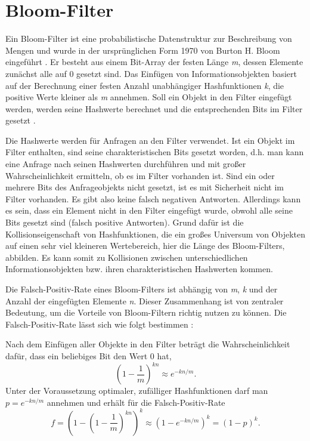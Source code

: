 \section{Bloom-Filter}\label{sec:bloom}
Ein Bloom-Filter ist eine probabilistische Datenstruktur zur Beschreibung von Mengen und wurde in der ursprünglichen Form 1970 von Burton H. Bloom eingeführt \cite{Bloom1970}. Er besteht aus einem Bit-Array der festen Länge \textit{m}, dessen Elemente zunächst alle auf 0 gesetzt sind. Das Einfügen von Informationsobjekten basiert auf der Berechnung einer festen Anzahl unabhängiger Hashfunktionen \textit{k}, die positive Werte kleiner als \textit{m} annehmen. Soll ein Objekt in den Filter eingefügt werden, werden seine Hashwerte berechnet und die entsprechenden Bits im Filter gesetzt \cite{Broder2004}. 

Die Hashwerte werden für Anfragen an den Filter verwendet. Ist ein Objekt im Filter enthalten, sind seine charakteristischen Bits gesetzt worden, d.h. man kann eine Anfrage nach seinen Hashwerten durchführen und mit großer Wahrscheinlichkeit ermitteln, ob es im Filter vorhanden ist. Sind ein oder mehrere Bits des Anfrageobjekts nicht gesetzt, ist es mit Sicherheit nicht im Filter vorhanden. Es gibt also keine falsch negativen Antworten. Allerdings kann es sein, dass ein Element nicht in den Filter eingefügt wurde, obwohl alle seine Bits gesetzt sind (falsch positive Antworten). Grund dafür ist die Kollisionseigenschaft von Hashfunktionen, die ein großes Universum von Objekten auf einen sehr viel kleineren Wertebereich, hier die Länge des Bloom-Filters, abbilden. Es kann somit zu Kollisionen zwischen unterschiedlichen Informationsobjekten bzw. ihren charakteristischen Hashwerten kommen. 

Die Falsch-Positiv-Rate eines Bloom-Filters ist abhängig von \textit{m}, \textit{k} und der Anzahl der eingefügten Elemente \textit{n}. Dieser Zusammenhang ist von zentraler Bedeutung, um die Vorteile von Bloom-Filtern richtig nutzen zu können. Die Falsch-Positiv-Rate lässt sich wie folgt bestimmen \cite{Broder2004}: 

Nach dem Einfügen aller Objekte in den Filter beträgt die Wahrscheinlichkeit dafür, dass ein beliebiges Bit den Wert 0 hat, 
\[\left(1 - \frac{1}{m}\right)^{kn}\approx e^{-kn/m}.\]
Unter der Voraussetzung optimaler, zufälliger Hashfunktionen darf man $p = e^{-kn/m}$ annehmen und erhält für die Falsch-Positiv-Rate
\[f = \left(1 - \left(1-\frac{1}{m}\right)^{kn}\right)^k\approx\left(1 - e^{-kn/m}\right)^k = (1-p)^k.\]

